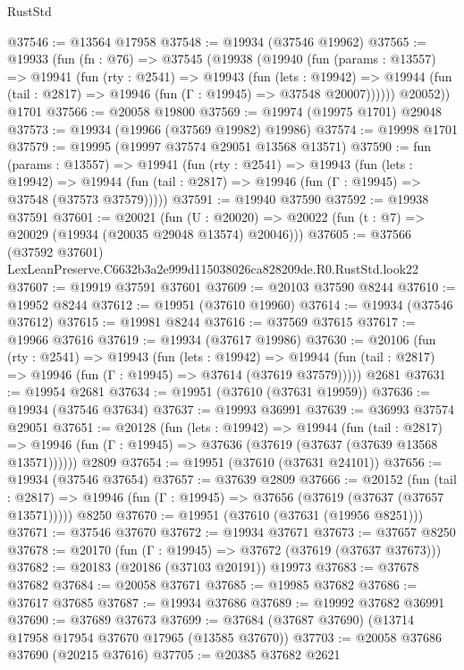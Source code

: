 \begin{lexlean}{RustStd}
\begin{coremodule}
@37546 := @13564 @17958
@37548 := @19934 (@37546 @19962)
@37565 := @19933
    (fun (fn : @76) =>
    @37545
      (@19938
        (@19940
          (fun (params : @13557) =>
          @19941
            (fun (rty : @2541) =>
            @19943
              (fun (lets : @19942) =>
              @19944 (fun (tail : @2817) => @19946 (fun (Γ : @19945) => @37548 @20007))))))
        @20052))
    @1701
@37566 := @20058 @19800
@37569 := @19974 (@19975 @1701) @29048
@37573 := @19934 (@19966 (@37569 @19982) @19986)
@37574 := @19998 @1701
@37579 := @19995 (@19997 @37574 @29051 @13568 @13571)
@37590 := fun (params : @13557) =>
  @19941
    (fun (rty : @2541) =>
    @19943
      (fun (lets : @19942) =>
      @19944 (fun (tail : @2817) => @19946 (fun (Γ : @19945) => @37548 (@37573 @37579)))))
@37591 := @19940 @37590
@37592 := @19938 @37591
@37601 := @20021
    (fun (U : @20020) => @20022 (fun (t : @7) => @20029 (@19934 (@20035 @29048 @13574) @20046)))
@37605 := @37566 (@37592 @37601) LexLeanPreserve.C6632b3a2e999d115038026ca828209de.R0.RustStd.look22
@37607 := @19919 @37591 @37601
@37609 := @20103 @37590 @8244
@37610 := @19952 @8244
@37612 := @19951 (@37610 @19960)
@37614 := @19934 (@37546 @37612)
@37615 := @19981 @8244
@37616 := @37569 @37615
@37617 := @19966 @37616
@37619 := @19934 (@37617 @19986)
@37630 := @20106
    (fun (rty : @2541) =>
    @19943
      (fun (lets : @19942) =>
      @19944 (fun (tail : @2817) => @19946 (fun (Γ : @19945) => @37614 (@37619 @37579)))))
    @2681
@37631 := @19954 @2681
@37634 := @19951 (@37610 (@37631 @19959))
@37636 := @19934 (@37546 @37634)
@37637 := @19993 @36991
@37639 := @36993 @37574 @29051
@37651 := @20128
    (fun (lets : @19942) =>
    @19944
      (fun (tail : @2817) =>
      @19946 (fun (Γ : @19945) => @37636 (@37619 (@37637 (@37639 @13568 @13571))))))
    @2809
@37654 := @19951 (@37610 (@37631 @24101))
@37656 := @19934 (@37546 @37654)
@37657 := @37639 @2809
@37666 := @20152
    (fun (tail : @2817) => @19946 (fun (Γ : @19945) => @37656 (@37619 (@37637 (@37657 @13571)))))
    @8250
@37670 := @19951 (@37610 (@37631 (@19956 @8251)))
@37671 := @37546 @37670
@37672 := @19934 @37671
@37673 := @37657 @8250
@37678 := @20170 (fun (Γ : @19945) => @37672 (@37619 (@37637 @37673)))
@37682 := @20183 (@20186 (@37103 @20191)) @19973
@37683 := @37678 @37682
@37684 := @20058 @37671
@37685 := @19985 @37682
@37686 := @37617 @37685
@37687 := @19934 @37686
@37689 := @19992 @37682 @36991
@37690 := @37689 @37673
@37699 := @37684 (@37687 @37690) (@13714 @17958 @17954 @37670 @17965 (@13585 @37670))
@37703 := @20058 @37686 @37690 (@20215 @37616)
@37705 := @20385 @37682 @2621

\end{coremodule}
\end{lexlean}
